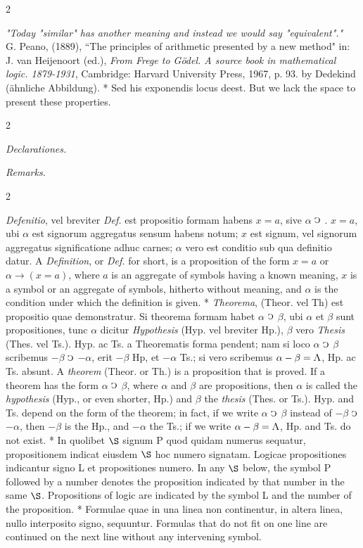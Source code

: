 \documentclass{book}
\newcommand{\C}{\mathop{\sbox0{$\displaystyle$$\reflectbox{C}$} %
\raisebox{-\height+\ht0-0.05cm}[\ht0][\dp0]{\scalebox{0.8}[0.8]{\copy0}}}\displaylimits} %
\newcommand{\abs}{\mathop{\rotatebox[origin=c]{180}{V}}}
\newcommand\peanoHeadingSmall[1]{ \vspace{0.75cm} \textit{#1} \nopagebreak[4]

\vspace{0.25cm} \nopagebreak[1]}
\newenvironment{translateTwoCol}
               { %
                 \columnratio{0.5, 0.5}
                 \begin{paracol}{2}
                 \newcommand{\LAT}{\switchcolumn[0]*}
                 \newcommand{\ENG}{\switchcolumn[1]}
               }
               { %
                 \let\ENG\undefined
                 \let\LAT\undefined
                 \end{paracol}
               }
\begin{document}
\begin{translateTwoCol}
{\quad \emph{"Today "similar" has another meaning and instead we would say "equivalent"."} \\

G. Peano, (1889), ``The principles of arithmetic presented by a new method" in: J. van Heijenoort (ed.), \emph{From Frege to G\"odel. A source book in mathematical logic. 1879-1931}, Cambridge: Harvard University Press, 1967, p. 93.} by Dedekind (\"ahnliche Abbildung).
\LAT
Sed his exponendis locus deest.
\ENG
But we lack the space to present these properties.
\end{translateTwoCol}

\begin{translateTwoCol}
\centering
{}
{}
\peanoHeadingSmall{Declarationes.}
\ENG
\peanoHeadingSmall{Remarks.}
\end{translateTwoCol}

\begin{translateTwoCol}
\emph{Defenitio}, vel breviter \emph{Def.} est propositio formam habens $x = a$, sive $\alpha$ $\C$ . $x = a$, ubi $\alpha$ est signorum aggregatus sensum habens notum; $x$ est signum, vel signorum aggregatus significatione adhuc carnes; $\alpha$ vero est conditio sub qua definitio datur.
\ENG
A \emph{Definition}, or \emph{Def.} for short, is a proposition of the form $x=a$ or $\alpha \rightarrow (x = a)$, where $a$ is an aggregate of symbols having a known meaning, $x$ is a symbol or an aggregate of symbols, hitherto without meaning, and $\alpha$ is the condition under which the definition is given.
\LAT
\emph{Theorema}, (Theor. vel Th) est propositio quae demonstratur. Si theorema formam habet $\alpha$ $\C$ $\beta$, ubi $\alpha$ et $\beta$ sunt propositiones, tunc $\alpha$ dicitur \emph{Hypothesis} (Hyp. vel breviter Hp.), $\beta$ vero \emph{Thesis} (Thes. vel Ts.). Hyp. ac Ts. a Theorematis forma pendent; nam si loco $\alpha$ $\C$ $\beta$ scribemus $- \beta$ $\C$ $- \alpha$, erit $- \beta$ Hp, et $- \alpha$ Ts.; si vero scribemus $\alpha - \beta = \abs$, Hp. ac Ts. absunt.
\ENG
A \emph{theorem} (Theor. or Th.) is a proposition that is proved. If a theorem has the form $\alpha$ $\C$ $\beta$, where $\alpha$ and $\beta$ are propositions, then $\alpha$ is called the \emph{hypothesis} (Hyp., or even shorter, Hp.) and $\beta$ the \emph{thesis} (Thes. or Ts.). Hyp. and Ts. depend on the form of the theorem; in fact, if we write $\alpha$ $\C$ $\beta$ instead of $- \beta$ $\C$ $- \alpha$, then $- \beta$ is the Hp., and $- \alpha$ the Ts.; if we write $\alpha - \beta = \abs$, Hp. and Ts. do not exist.
\LAT
In quolibet $\S$ signum P quod quidam numerus sequatur, propositionem indicat eiusdem $\S$ hoc numero signatam. Logicae propositiones indicantur signo L et propositiones numero.
\ENG
In any $\S$ below, the symbol P followed by a number denotes the proposition indicated by that number in the same $\S$. Propositions of logic are indicated by the symbol L and the number of the proposition.
\LAT
Formulae quae in una linea non continentur, in altera linea, nullo interposito signo, sequuntur.
\ENG
Formulas that do not fit on one line are continued on the next line without any intervening symbol.
\end{translateTwoCol}
\end{document}

